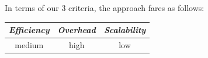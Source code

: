 %
In terms of our $3$ criteria, the approach fares as follows:
\begin{center}
{\footnotesize
\begin{tabular}{ccc}
\emph{Efficiency} & \emph{Overhead} & \emph{Scalability} \\
\hline
medium &
high &
low
\end{tabular}
}
\end{center}






